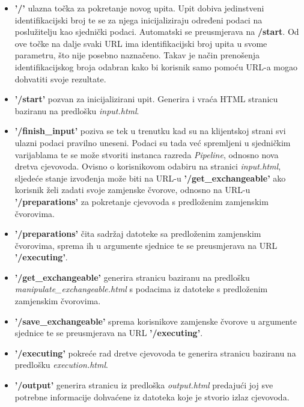 \begin{itemize}

    \item \textbf{'/'} ulazna točka za pokretanje novog upita. Upit dobiva
jedinstveni identifikacijski broj te se za njega inicijaliziraju određeni podaci
na poslužitelju kao sjednički podaci. Automatski se preusmjerava na
\textbf{/start}. Od ove točke na dalje svaki URL ima identifikacijski broj upita
u svome parametru, što nije posebno naznačeno. Takav je način prenošenja
identifikacijskog broja odabran kako bi korisnik samo pomoću URL-a mogao
dohvatiti svoje rezultate.

    \item \textbf{'/start'} pozvan za inicijalizirani upit. Generira i vraća
HTML stranicu baziranu na predlošku \emph{input.html}.

    \item \textbf{'/finish\_input'} poziva se tek u trenutku kad su na klijentskoj
strani svi ulazni podaci pravilno uneseni. Podaci su tada već spremljeni u
sjedničkim varijablama te se može stvoriti instanca razreda \emph{Pipeline},
odnosno nova dretva cjevovoda. Ovisno o korisnikovom odabiru na stranici
\emph{input.html}, sljedeće stanje izvođenja može biti na URL-u
\textbf{'/get\_exchangeable'} ako korisnik želi zadati svoje zamjenske čvorove,
odnosno na URL-u \textbf{'/preparations'} za pokretanje cjevovoda s predloženim
zamjenskim čvorovima.

    \item \textbf{'/preparations'} čita sadržaj datoteke sa predloženim
zamjenskim čvorovima, sprema ih u argumente sjednice te se preusmjerava na URL
\textbf{'/executing'}.

    \item \textbf{'/get\_exchangeable'} generira stranicu baziranu na predlošku
\emph{manipulate\_exchangeable.html} s podacima  iz datoteke s predloženim
zamjenskim čvorovima.

    \item \textbf{'/save\_exchangeable'} sprema korisnikove zamjenske čvorove u
argumente sjednice te se preusmjerava na URL \textbf{'/executing'}.

    \item \textbf{'/executing'} pokreće rad dretve cjevovoda te generira
stranicu baziranu na predlošku \emph{execution.html}.

    \item \textbf{'/output'} generira stranicu iz predloška \emph{output.html}
predajući joj sve potrebne informacije dohvaćene iz datoteka koje je stvorio
izlaz cjevovoda.

\end{itemize}

